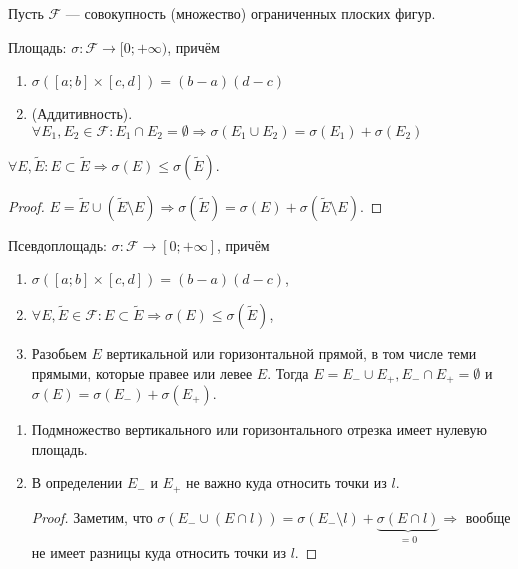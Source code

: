 Пусть $\mathcal{F}$ --- совокупность (множество) ограниченных плоских фигур. 
\begin{definition}
    Площадь: $\sigma\!: \mathcal{F} \to [0; +\infty)$, причём 
     \begin{enumerate}
         \item $\sigma([a; b] \times [c, d]) = (b - a)(d - c)$
         \item (Аддитивность).  $\forall E_1, E_2 \in \mathcal{F}\!: E_1 \cap E_2 = \emptyset \Rightarrow \sigma(E_1 \cup E_2) = \sigma(E_1) + \sigma(E_2)$
    \end{enumerate}
\end{definition}
\begin{property}
    $\forall E, \widetilde{E}\!: E \subset \widetilde{E} \Rightarrow \sigma(E) \le \sigma(\widetilde{E})$.
\end{property}
\begin{proof}
    $E = \widetilde{E} \cup (\widetilde{E} \setminus E) \Rightarrow \sigma(\widetilde{E}) = \sigma(E) + \sigma(\widetilde{E} \setminus E)$.
\end{proof}
\begin{definition}
    Псевдоплощадь: $\sigma\!: \mathcal{F} \to [0; +\infty]$, причём
     \begin{enumerate}
         \item $\sigma([a; b] \times [c, d]) = (b - a)(d - c)$,
         \item $\forall E, \widetilde{E} \in \mathcal{F}\!: E \subset \widetilde{E} \Rightarrow \sigma(E) \le \sigma(\widetilde{E})$, 
         \item Разобьем $E$ вертикальной или горизонтальной прямой, в том числе теми прямыми, которые правее или левее $E$. Тогда  $E = E_- \cup E_+, E_- \cap E_+ = \emptyset$ и  $\sigma(E) = \sigma(E_-) + \sigma(E_+)$.
    \end{enumerate}
\end{definition}
\begin{properties}
    \begin{enumerate}
        \item Подмножество вертикального или горизонтального отрезка имеет нулевую площадь.
        \item В определении $E_-$ и  $E_+$ не важно  куда относить точки из  $l$.
            \begin{proof}
                Заметим, что $\sigma(E_- \cup (E \cap l)) = \sigma(E_- \setminus l) + \underbrace{\sigma(E \cap l)}_{=0} \Rightarrow$ вообще не имеет разницы куда относить точки из  $l$.
            \end{proof}
    \end{enumerate}
\end{properties}
